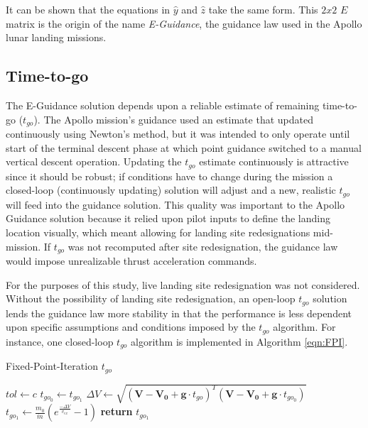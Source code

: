 It can be shown that the equations in $\hat{y}$ and $\hat{z}$ take the same form. This $2x2$ $E$ matrix is the origin of the name \textit{E-Guidance}, the guidance law used in the Apollo lunar landing missions.

\subsection{Time-to-go}
The E-Guidance solution depends upon a reliable estimate of remaining time-to-go ($t_{go}$). The Apollo mission's guidance used an estimate that updated continuously using Newton's method, but it was intended to only operate until start of the terminal descent phase at which point guidance switched to a manual vertical descent operation. Updating the $t_{go}$ estimate continuously is attractive since it should be robust; if conditions have to change during the mission a closed-loop (continuously updating) solution will adjust and a new, realistic $t_{go}$ will feed into the guidance solution. This quality was important to the Apollo Guidance solution because it relied upon pilot inputs to define the landing location visually, which meant allowing for landing site redesignations mid-mission. If $t_{go}$ was not recomputed after site redesignation, the guidance law would impose unrealizable thrust acceleration commands.

For the purposes of this study, live landing site redesignation was not considered. Without the possibility of landing site redesignation, an open-loop $t_{go}$ solution lends the guidance law more stability in that the performance is less dependent upon specific assumptions and conditions imposed by the $t_{go}$ algorithm. For instance, one closed-loop $t_{go}$ algorithm is implemented in Algorithm \ref{eqn:FPI}.

\begin{algorithm}
	\caption{Fixed-Point-Iteration $t_{go}$}\label{eqn:FPI}
	\begin{algorithmic}[1]
		\State $tol\gets c$
		\State $t_{go_0} \gets t_{go_1}$
		\State $\Delta V \gets \sqrt{(\boldsymbol{V}-\boldsymbol{V_0} + \boldsymbol{g}\cdot t_{go})^T(\boldsymbol{V}-\boldsymbol{V_0} + \boldsymbol{g}\cdot t_{go_0})}$
		\State $t_{go_1} \gets \frac{m_0}{\dot{m}}\left(e^{\frac{-\Delta V}{v_{ex}}}-1\right)$ 
		\EndWhile
		\State \textbf{return} $t_{go_1}$
		\EndProcedure
	\end{algorithmic}
\end{algorithm}

